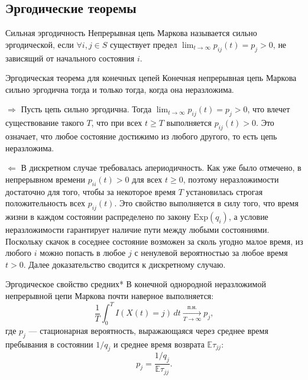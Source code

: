 \subsection{Эргодические теоремы}

\begin{definition}{Сильная эргодичность}
    Непрерывная цепь Маркова называется сильно эргодической, если $\forall i, j \in S$ существует предел $\lim_{t \to \infty} p_{ij}(t) = p_j > 0$, не зависящий от начального состояния $i$.
\end{definition}

\begin{theorem}{Эргодическая теорема для конечных цепей}
    Конечная непрерывная цепь Маркова сильно эргодична тогда и только тогда, когда она неразложима.
\end{theorem}

\begin{tproof}
    $\Rightarrow$ Пусть цепь сильно эргодична. Тогда $\lim_{t \to \infty} p_{ij}(t) = p_j > 0$, что влечет существование такого $T$, что при всех $t \geqslant T$ выполняется $p_{ij}(t) > 0$. Это означает, что любое состояние достижимо из любого другого, то есть цепь неразложима.
    
    $\Leftarrow$ В дискретном случае требовалась апериодичность. Как уже было отмечено, в непрерывном времени $p_{ii}(t) > 0$ для всех $t \geqslant 0$, поэтому неразложимости достаточно для того, чтобы за некоторое время $T$ установилась строгая положительность всех $p_{ij}(t)$. Это свойство выполняется в силу того, что время жизни в каждом состоянии распределено по закону $\text{Exp}(q_i)$, а условие неразложимости гарантирует наличие пути между любыми состояниями. Поскольку скачок в соседнее состояние возможен за сколь угодно малое время, из любого $i$ можно попасть в любое $j$ с ненулевой вероятностью за любое время $t > 0$. Далее доказательство сводится к дискретному случаю.
\end{tproof}

\begin{theorem}{Эргодическое свойство средних*}
    В конечной однородной неразложимой непрерывной цепи Маркова почти наверное выполняется:
    \begin{equation}
        \frac{1}{T} \int_0^T I(X(t)=j) \, dt \xrightarrow[T \to \infty]{\text{п.н.}} p_j,
    \end{equation}
    где $p_j$ — стационарная вероятность, выражающаяся через среднее время пребывания в состоянии $1/q_j$ и среднее время возврата $\mathbb{E}\tau_{jj}$:
    \begin{equation}
        p_j = \frac{1/q_j}{\mathbb{E}\tau_{jj}}.
    \end{equation}
\end{theorem}

